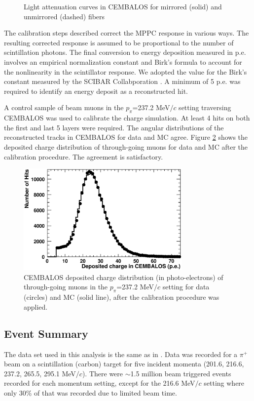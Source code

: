 \begin{enumerate}
\begin{figure}[!h]
\begin{center}
\caption{Light attenuation curves in CEMBALOS for mirrored (solid) and unmirrored (dashed) fibers}
\label{fig:attcurves}
\end{center} 
\end{figure}
\end{enumerate}

The calibration steps described correct the MPPC response in various ways. The resulting corrected response is assumed to be proportional to the number of scintillation photons. The final conversion to energy deposition measured in p.e. involves  an empirical normalization constant and Birk's formula to account for the nonlinearity in the scintillator response. We adopted the value for the Birk's constant measured by the SCIBAR Collabporation \cite{scibar}. A minimum of 5 p.e. was required to identify an energy deposit as a reconstructed hit.

A control sample of beam muons in the $p_{\pi}$=237.2 MeV$/c$ setting traversing CEMBALOS was used to calibrate the charge simulation. At least 4 hits on both the first and last 5 layers were required. The angular distributions of the reconstructed tracks in CEMBALOS for data and MC agree. Figure \ref{fig:muoncharge} shows the deposited charge distribution of through-going muons for data and MC after the calibration procedure. The agreement is satisfactory.

\begin{figure}[!h]
\begin{center}
\includegraphics[width=85mm]{figures/muon_charge_calib.eps}
\caption{CEMBALOS deposited charge distribution (in photo-electrons) of through-going muons in the $p_{\pi}$=237.2 MeV$/c$ setting for data (circles) and MC (solid line), after the calibration procedure was applied.}
\label{fig:muoncharge}
\end{center}
\end{figure}

\subsection{Event Summary}
The data set used in this analysis is the same as in \cite{duet}. Data was recorded for a $\pi^{+}$ beam on a scintillation (carbon) target for five incident momenta (201.6, 216.6, 237.2, 265.5, 295.1 MeV$/c$). There were $\sim$1.5 million beam triggered events recorded for each momentum setting, except for the 216.6 MeV$/c$ setting where only 30\% of that was recorded due to limited beam time.
